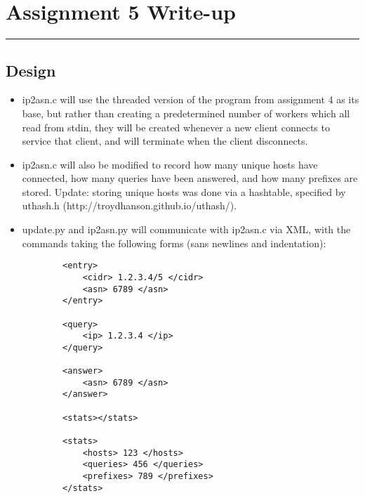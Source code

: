 \documentclass[letterpaper,10pt,fleqn]{article}
\numberwithin{equation}{section}
\begin{document}

\section*{Assignment 5 Write-up}
\hrule

\subsection*{Design}
\begin{itemize}
    \item ip2asn.c will use the threaded version of the program from assignment 4 as its base, but rather than creating a predetermined number of workers which all read from stdin, they will be created whenever a new client connects to service that client, and will terminate when the client disconnects.
    \item ip2asn.c will also be modified to record how many unique hosts have connected, how many queries have been answered, and how many prefixes are stored.  Update: storing unique hosts was done via a hashtable, specified by uthash.h (http://troydhanson.github.io/uthash/).
    \item update.py and ip2asn.py will communicate with ip2asn.c via XML, with the commands taking the following forms (sans newlines and indentation):
    \begin{verbatim}
        <entry>
            <cidr> 1.2.3.4/5 </cidr>
            <asn> 6789 </asn>
        </entry>

        <query>
            <ip> 1.2.3.4 </ip>
        </query>

        <answer>
            <asn> 6789 </asn>
        </answer>

        <stats></stats>

        <stats>
            <hosts> 123 </hosts>
            <queries> 456 </queries>
            <prefixes> 789 </prefixes>
        </stats>


\end{verbatim}
\end{itemize}
\end{document}
